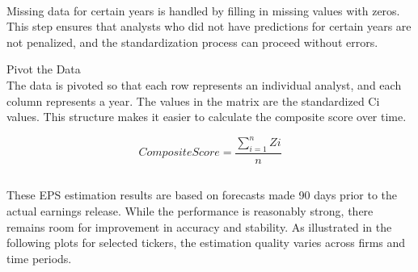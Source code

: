   \item 
  \\Missing data for certain years is handled by filling in missing values with zeros. This step ensures that analysts who did not have predictions for certain years are not penalized, and the standardization process can proceed without errors.
  \item Pivot the Data 
  \\ The data is pivoted so that each row represents an individual analyst, and each column represents a year. The values in the matrix are the standardized Ci values. This structure makes it easier to calculate the composite score over time.

   \begin{equation}
   \label{eq:def_CS}
    Composite Score = \frac{\sum_{i=1}^{n} Z{i} }{n}
   \end{equation}

   \subsection {}

  

   These EPS estimation results are based on forecasts made 90 days prior to the actual earnings release. While the performance is reasonably strong, there remains room for improvement in accuracy and stability. As illustrated in the following plots for selected tickers, the estimation quality varies across firms and time periods.


   